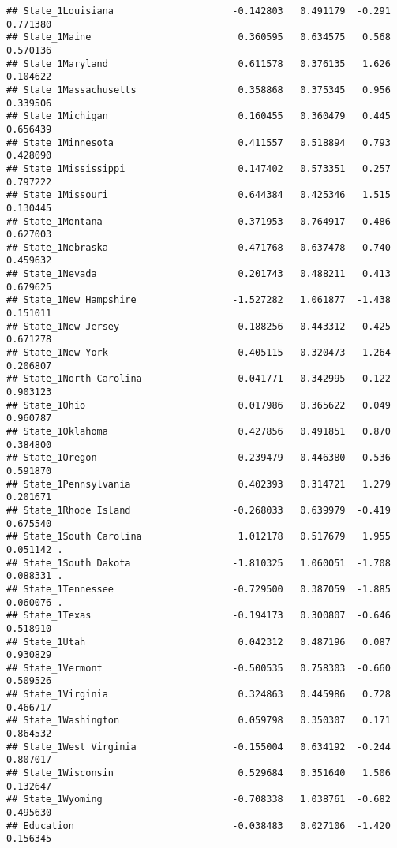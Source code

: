 \documentclass[
]{article}
\begin{document}
\begin{verbatim}
## State_1Louisiana                     -0.142803   0.491179  -0.291 0.771380    
## State_1Maine                          0.360595   0.634575   0.568 0.570136    
## State_1Maryland                       0.611578   0.376135   1.626 0.104622    
## State_1Massachusetts                  0.358868   0.375345   0.956 0.339506    
## State_1Michigan                       0.160455   0.360479   0.445 0.656439    
## State_1Minnesota                      0.411557   0.518894   0.793 0.428090    
## State_1Mississippi                    0.147402   0.573351   0.257 0.797222    
## State_1Missouri                       0.644384   0.425346   1.515 0.130445    
## State_1Montana                       -0.371953   0.764917  -0.486 0.627003    
## State_1Nebraska                       0.471768   0.637478   0.740 0.459632    
## State_1Nevada                         0.201743   0.488211   0.413 0.679625    
## State_1New Hampshire                 -1.527282   1.061877  -1.438 0.151011    
## State_1New Jersey                    -0.188256   0.443312  -0.425 0.671278    
## State_1New York                       0.405115   0.320473   1.264 0.206807    
## State_1North Carolina                 0.041771   0.342995   0.122 0.903123    
## State_1Ohio                           0.017986   0.365622   0.049 0.960787    
## State_1Oklahoma                       0.427856   0.491851   0.870 0.384800    
## State_1Oregon                         0.239479   0.446380   0.536 0.591870    
## State_1Pennsylvania                   0.402393   0.314721   1.279 0.201671    
## State_1Rhode Island                  -0.268033   0.639979  -0.419 0.675540    
## State_1South Carolina                 1.012178   0.517679   1.955 0.051142 .  
## State_1South Dakota                  -1.810325   1.060051  -1.708 0.088331 .  
## State_1Tennessee                     -0.729500   0.387059  -1.885 0.060076 .  
## State_1Texas                         -0.194173   0.300807  -0.646 0.518910    
## State_1Utah                           0.042312   0.487196   0.087 0.930829    
## State_1Vermont                       -0.500535   0.758303  -0.660 0.509526    
## State_1Virginia                       0.324863   0.445986   0.728 0.466717    
## State_1Washington                     0.059798   0.350307   0.171 0.864532    
## State_1West Virginia                 -0.155004   0.634192  -0.244 0.807017    
## State_1Wisconsin                      0.529684   0.351640   1.506 0.132647    
## State_1Wyoming                       -0.708338   1.038761  -0.682 0.495630    
## Education                            -0.038483   0.027106  -1.420 0.156345    

\end{verbatim}
\end{document}
